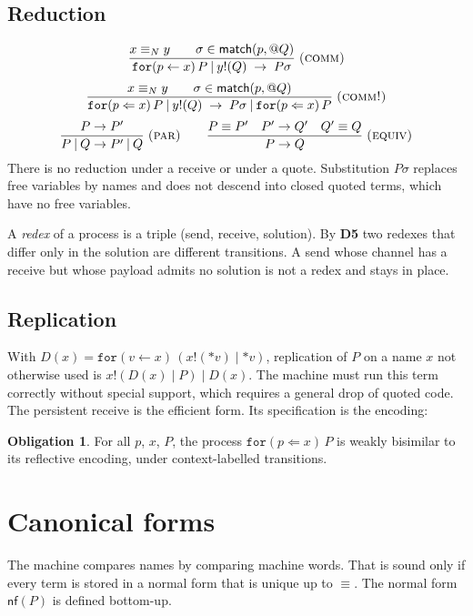\documentclass[11pt]{article}
\makeatletter
\newcommand{\kw}[1]{\texttt{#1}}
\newcommand{\quo}[1]{@#1}
\newcommand{\drp}[1]{{*}#1}
\newcommand{\for}[3]{\kw{for}(#1 \leftarrow #2)\,#3}
\newcommand{\forp}[3]{\kw{for}(#1 \Leftarrow #2)\,#3}
\newcommand{\snd}[2]{#1!(#2)}
\newcommand{\cpar}{\mathbin{|}}
\newcommand{\scong}{\equiv}
\newcommand{\nameq}{\equiv_N}
\newcommand{\red}{\rightarrow}
\newcommand{\nf}[1]{\mathsf{nf}(#1)}
\newcommand{\dec}[1]{\textbf{D#1}}
\theoremstyle{definition}
\newtheorem{obligation}{Obligation}
\theoremstyle{remark}
\makeatother
\begin{document}
\subsection{Reduction}\label{sec:reduction}

\[
\frac{x \nameq y \qquad \sigma \in \mathsf{match}(p,\quo{Q})}
     {\for{p}{x}{P} \cpar \snd{y}{Q} \;\red\; P\sigma}\;\textsc{(comm)}
\]
\[
\frac{x \nameq y \qquad \sigma \in \mathsf{match}(p,\quo{Q})}
     {\forp{p}{x}{P} \cpar \snd{y}{Q} \;\red\; P\sigma \cpar \forp{p}{x}{P}}\;\textsc{(comm!)}
\]
\[
\frac{P \red P'}{P \cpar Q \red P' \cpar Q}\;\textsc{(par)}
\qquad
\frac{P \scong P' \quad P' \red Q' \quad Q' \scong Q}{P \red Q}\;\textsc{(equiv)}
\]
There is no reduction under a receive or under a quote. Substitution
$P\sigma$ replaces free variables by names and does not descend into closed
quoted terms, which have no free variables.

A \emph{redex} of a process is a triple (send, receive, solution). By \dec{5}
two redexes that differ only in the solution are different transitions. A
send whose channel has a receive but whose payload admits no solution is not
a redex and stays in place.

\subsection{Replication}

With $D(x) = \for{v}{x}{(\snd{x}{\drp{v}} \cpar \drp{v})}$, replication of
$P$ on a name $x$ not otherwise used is
$\snd{x}{D(x) \cpar P} \cpar D(x)$. The machine must run this term correctly
without special support, which requires a general drop of quoted code.
The persistent receive is the efficient form. Its specification is the
encoding:
\begin{obligation}\label{ob:repl}
For all $p$, $x$, $P$, the process $\forp{p}{x}{P}$ is weakly bisimilar to
its reflective encoding, under context-labelled transitions.
\end{obligation}

\section{Canonical forms}\label{sec:canon}

The machine compares names by comparing machine words. That is sound only if
every term is stored in a normal form that is unique up to $\scong$. The
normal form $\nf{P}$ is defined bottom-up.
\end{document}
